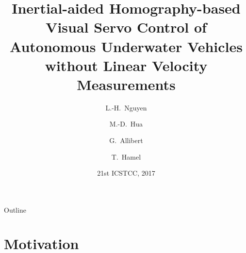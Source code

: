 \documentclass{beamer}
\title[AUV control without linear velocity measurements] %
{Inertial-aided Homography-based Visual Servo Control of Autonomous Underwater Vehicles without Linear Velocity Measurements}
\author[Nguyen, Hua, Allibert and Hamel] %
{L.-H.~Nguyen \and M.-D.~Hua \and G.~Allibert \and T.~Hamel}
\institute[Universities of Somewhere and Elsewhere] %
{
	\textit{Universit\'e C\^ote d'Azur, CNRS, I3S}\\
	Sophia Antipolis, France \\
	lhnguyen(hua,allibert,thamel)@i3s.unice.fr}
\date[ICSTCC 2017] %
{21st ICSTCC, 2017}
\begin{document}
\begin{frame}
  \titlepage
\end{frame}

\begin{frame}{Outline}
  \tableofcontents
\end{frame}





\section{Motivation}

\end{document}
